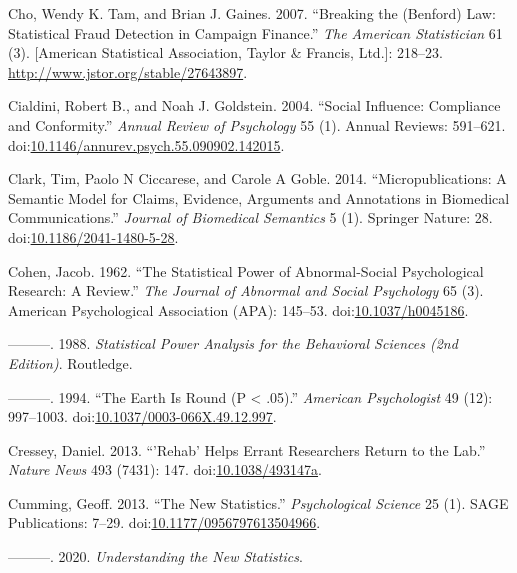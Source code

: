 \documentclass[a5paper]{book}
\begin{document}
\hypertarget{ref-doi:10.2307ux2f27643897}{}
Cho, Wendy K. Tam, and Brian J. Gaines. 2007. ``Breaking the (Benford)
Law: Statistical Fraud Detection in Campaign Finance.'' \emph{The
American Statistician} 61 (3). {[}American Statistical Association,
Taylor \& Francis, Ltd.{]}: 218--23.
\url{http://www.jstor.org/stable/27643897}.

\hypertarget{ref-doi:10.1146ux2fannurev.psych.55.090902.142015}{}
Cialdini, Robert B., and Noah J. Goldstein. 2004. ``Social Influence:
Compliance and Conformity.'' \emph{Annual Review of Psychology} 55 (1).
Annual Reviews: 591--621.
doi:\href{https://doi.org/10.1146/annurev.psych.55.090902.142015}{10.1146/annurev.psych.55.090902.142015}.

\hypertarget{ref-doi:10.1186ux2f2041-1480-5-28}{}
Clark, Tim, Paolo N Ciccarese, and Carole A Goble. 2014.
``Micropublications: A Semantic Model for Claims, Evidence, Arguments
and Annotations in Biomedical Communications.'' \emph{Journal of
Biomedical Semantics} 5 (1). Springer Nature: 28.
doi:\href{https://doi.org/10.1186/2041-1480-5-28}{10.1186/2041-1480-5-28}.

\hypertarget{ref-doi:10.1037ux2fh0045186}{}
Cohen, Jacob. 1962. ``The Statistical Power of Abnormal-Social
Psychological Research: A Review.'' \emph{The Journal of Abnormal and
Social Psychology} 65 (3). American Psychological Association (APA):
145--53. doi:\href{https://doi.org/10.1037/h0045186}{10.1037/h0045186}.

\hypertarget{ref-isbn:9780805802832}{}
---------. 1988. \emph{Statistical Power Analysis for the Behavioral
Sciences (2nd Edition)}. Routledge.

\hypertarget{ref-doi:10.1037ux2f0003-066X.49.12.997}{}
---------. 1994. ``The Earth Is Round (P \textless{} .05).''
\emph{American Psychologist} 49 (12): 997--1003.
doi:\href{https://doi.org/10.1037/0003-066X.49.12.997}{10.1037/0003-066X.49.12.997}.

\hypertarget{ref-doi:10.1038ux2f493147a}{}
Cressey, Daniel. 2013. ``'Rehab' Helps Errant Researchers Return to the
Lab.'' \emph{Nature News} 493 (7431): 147.
doi:\href{https://doi.org/10.1038/493147a}{10.1038/493147a}.

\hypertarget{ref-doi:10.1177ux2f0956797613504966}{}
Cumming, Geoff. 2013. ``The New Statistics.'' \emph{Psychological
Science} 25 (1). SAGE Publications: 7--29.
doi:\href{https://doi.org/10.1177/0956797613504966}{10.1177/0956797613504966}.

\hypertarget{ref-isbn:9780415879682}{}
---------. 2020. \emph{Understanding the New Statistics}.
\end{document}
